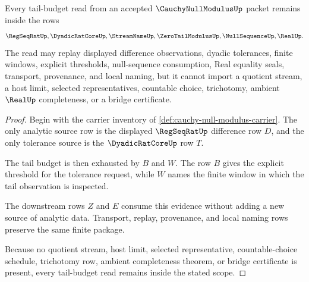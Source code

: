 \begin{theorem}
\label{thm:cauchy-null-modulus-tail-budget-scope}
Every tail-budget read from an accepted $\CauchyNullModulusUp$ packet remains inside the rows
$$
\RegSeqRatUp,\DyadicRatCoreUp,\StreamNameUp,\ZeroTailModulusUp,\NullSequenceUp,\RealUp.
$$
The read may replay displayed difference observations, dyadic tolerances, finite windows, explicit thresholds, null-sequence consumption, Real equality seals, transport, provenance, and local naming, but it cannot import a quotient stream, a host limit, selected representatives, countable choice, trichotomy, ambient $\RealUp$ completeness, or a bridge certificate.
\end{theorem}
\begin{proof}
Begin with the carrier inventory of \autoref{def:cauchy-null-modulus-carrier}. The only analytic source row is the displayed $\RegSeqRatUp$ difference row $D$, and the only tolerance source is the $\DyadicRatCoreUp$ row $T$.

The tail budget is then exhausted by $B$ and $W$. The row $B$ gives the explicit threshold for the tolerance request, while $W$ names the finite window in which the tail observation is inspected.

The downstream rows $Z$ and $E$ consume this evidence without adding a new source of analytic data. Transport, replay, provenance, and local naming rows preserve the same finite package.

Because no quotient stream, host limit, selected representative, countable-choice schedule, trichotomy row, ambient completeness theorem, or bridge certificate is present, every tail-budget read remains inside the stated scope.
\end{proof}


